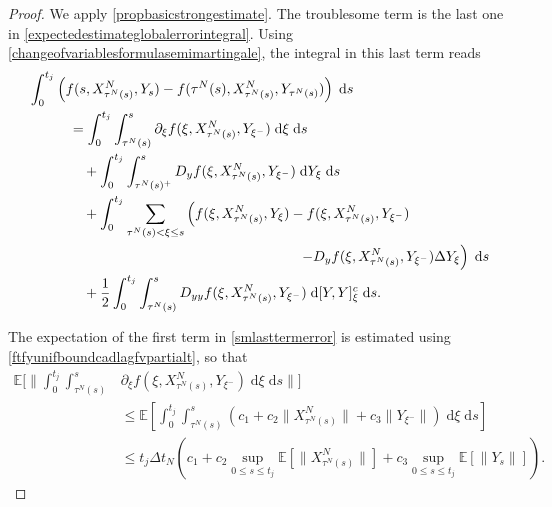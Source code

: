 \documentclass[reqno,12pt]{amsart}
\theoremstyle{plain} %
\theoremstyle{definition} %
\begin{document}
\begin{proof}
    We apply \cref{propbasicstrongestimate}. The troublesome term is the last one in \cref{expectedestimateglobalerrorintegral}. Using \cref{changeofvariablesformulasemimartingale}, the integral in this last term reads
    \begin{equation}
        \label{smlasttermerror}
        \begin{aligned}
            \int_0^{t_j} & \left( f(s, X_{\tau^N(s)}^N, Y_s) - f(\tau^N(s), X_{\tau^N(s)}^N, Y_{\tau^N(s)}) \right)\;\mathrm{d}s \\
            & \quad = \int_0^{t_j} \int_{\tau^N(s)}^s \partial_\xi f(\xi, X_{\tau^N(s)}^N, Y_{\xi^-})\;\mathrm{d}\xi \;\mathrm{d}s \\
            & \qquad + \int_0^{t_j} \int_{\tau^N(s)^+}^s D_y f(\xi, X_{\tau^N(s)}^N, Y_{\xi^-}) \;\mathrm{d}Y_\xi \;\mathrm{d}s \\
            & \qquad + \int_0^{t_j} \sum_{\tau^N(s) < \xi \leq s} \left(f(\xi, X_{\tau^N(s)}^N, Y_\xi) - f(\xi, X_{\tau^N(s)}^N, Y_{\xi^{-}}) \right. \\
            & \hspace{2.4in} \left. - D_y f(\xi, X_{\tau^N(s)}^N, Y_{\xi^-})\Delta Y_\xi\right) \;\mathrm{d}s \\ 
            & \qquad + \frac{1}{2} \int_0^{t_j} \int_{\tau^N(s)}^s D_{yy}f(\xi, X_{\tau^N(s)}^N, Y_{\xi^-})\;\mathrm{d}[Y, Y]_\xi^c\;\mathrm{d}s.
        \end{aligned}
    \end{equation}
    
    The expectation of the first term in \cref{smlasttermerror} is estimated using \cref{ftfyunifboundcadlagfvpartialt}, so that
    \begin{equation}
        \label{strongorderterm1}
        \begin{aligned}
            \mathbb{E}\bigg[\bigg\| \int_0^{t_j} \int_{\tau^N(s)}^s & \partial_\xi f(\xi, X_{\tau^N(s)}^N, Y_{\xi^-})\;\mathrm{d}\xi\;\mathrm{d}s\bigg\|\bigg] \\
            & \leq \mathbb{E}\left[\int_0^{t_j} \int_{\tau^N(s)}^s \left(c_1 + c_2 \|X_{\tau^N(s)}^N\| + c_3\|Y_{\xi^-}\|\right)\;\mathrm{d}\xi\;\mathrm{d}s\right] \\
            & \leq t_j \Delta t_N \left(c_1 + c_2 \sup_{0\leq s \leq t_j} \mathbb{E}\left[\|X_{\tau^N(s)}^N\|\right] + c_3\sup_{0 \leq s \leq t_j}\mathbb{E}\left[\|Y_s\|\right]\right).
        \end{aligned}
    \end{equation}


\end{proof}
\end{document}
